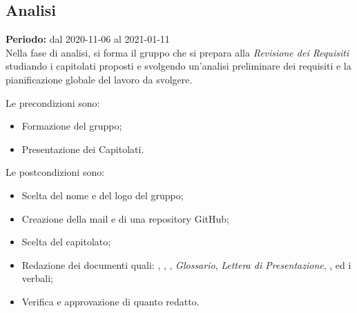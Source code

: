 \subsection{Analisi}
\label{analisi}
\textbf{Periodo:} dal 2020-11-06 al 2021-01-11\\
Nella fase di analisi, si forma il gruppo che si prepara alla \textit{Revisione dei Requisiti} studiando i capitolati proposti e svolgendo un'analisi preliminare dei requisiti e la pianificazione globale del lavoro da svolgere.


Le precondizioni sono:
\begin{itemize}
    \item Formazione del gruppo;
    \item Presentazione dei Capitolati.
\end{itemize}

Le postcondizioni sono:
\begin{itemize}
    \item Scelta del nome e del logo del gruppo;
    \item Creazione della mail e di una repository GitHub;
    \item Scelta del capitolato;
    \item Redazione dei documenti quali: \textit{\SdF}, \textit{\NdP}, \textit{\PdP}, \textit{Glossario}, \textit{Lettera di Presentazione}, \textit{\PdQ}, \textit{\AdR} ed i verbali;
    \item Verifica e approvazione di quanto redatto.
\end{itemize}

